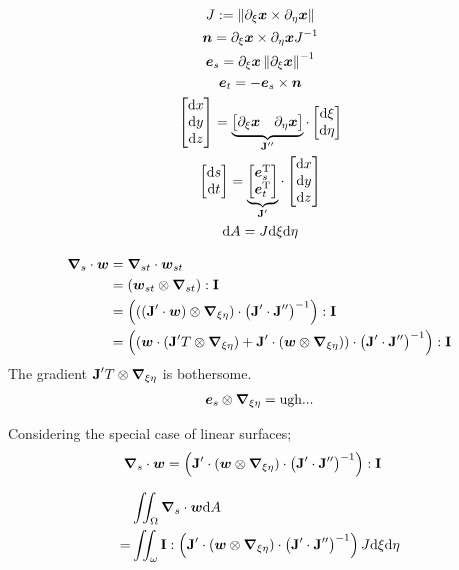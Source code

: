 \documentclass[a4paper,11pt]{article}
\renewcommand{\to}[1]{\text{\boldmath $#1$}} %
\newcommand{\ts}[1]{\text{\boldmath $\mathrm{#1}$}} %
\newcommand{\intd}[1]{\mathrm{d}#1}
\newcommand{\pderiv}[2]{\partial_{#2} #1}
\newcommand{\norm}[1]{\left\lVert{#1}\right\rVert}
\newcommand{\T}{\mathrm{T}}
\newcommand{\defeq}{:=}
\begin{document}
\begin{gather}
 J \defeq \norm{\pderiv{\to x}{\xi} \times  \pderiv{\to x}{\eta}}\\
 \to n = \pderiv{\to x}{\xi} \times \pderiv{\to x}{\eta} J^{-1}\\
 \to e_s = \pderiv{\to x}{\xi}\norm{\pderiv{\to x}{\xi}}^{-1}\\
 \to e_t = -\to e_s\times \to n\\
 \begin{bmatrix}\intd x\\ \intd y\\ \intd z\end{bmatrix} =
  \underbrace{\begin{bmatrix}\pderiv{\to x}{\xi} & \pderiv{\to x}{\eta}
  \end{bmatrix}}_{\ts J''}
  \cdot \begin{bmatrix}\intd \xi \\ \intd \eta\end{bmatrix}\\
 \begin{bmatrix}\intd s\\ \intd t\end{bmatrix} =
  \underbrace{\begin{bmatrix} \to e_s^\T \\ \to e_t^\T
  \end{bmatrix}}_{\ts J'}
  \cdot \begin{bmatrix}\intd x \\ \intd y \\ \intd z\end{bmatrix}\\
 \intd A = J \intd \xi \intd \eta
\end{gather}

\begin{align}
 \to\nabla_s\cdot\to w &= \to\nabla_{st}\cdot\to w_{st} \\
 &= (\to w_{st}\otimes\to\nabla_{st}):\ts I \\
 &= \left(((\ts J'\cdot \to w) \otimes \to\nabla_{\xi\eta})\cdot \left(\ts J'\cdot\ts J''\right)^{-1}\right): \ts I\\
 &= \left((\to w\cdot (\ts J'^\T \otimes \to\nabla_{\xi\eta}) +\ts J'\cdot(\to w\otimes\to\nabla_{\xi\eta}) )\cdot \left(\ts J'\cdot\ts J''\right)^{-1}\right): \ts I
\end{align}
The gradient $\ts J'^\T \otimes\to\nabla_{\xi\eta}$ is bothersome.
\begin{align}
 \to e_s \otimes \to\nabla_{\xi\eta} = \text{ugh...}
\end{align}

Considering the special case of linear surfaces;
\begin{align}
  \to\nabla_s\cdot\to w &= \left(\ts J'\cdot(\to w\otimes\to\nabla_{\xi\eta})\cdot \left(\ts J'\cdot\ts J''\right)^{-1}\right): \ts I
\end{align}

\begin{align}
 &\iint_\Omega\to \nabla_s\cdot\to w\intd A\\
=&\iint_\omega \ts I:\left(\ts J'\cdot(\to w\otimes\to\nabla_{\xi\eta})\cdot \left(\ts J'\cdot\ts J''\right)^{-1}\right)J\intd\xi\intd\eta
\end{align}
\end{document}
